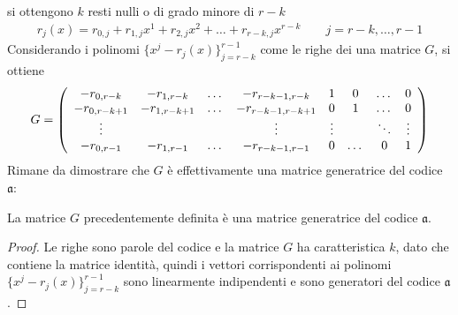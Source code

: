 si ottengono $k$ resti nulli o di grado minore di $r-k$
\begin{align*}
   r_{j}(x) = r_{0,j} + r_{1,j}x^{1} + r_{2,j}x^{2} + \dots + r_{r-k,j}x^{r- k}     \qquad j = r-k , \dots , r-1
\end{align*}
Considerando i polinomi $\lbrace x^j - r_{j}(x)\rbrace_{j= r-k}^{r-1}$ come le righe dei una matrice $G$, si ottiene
\begin{align*}
  G =
  \left(
  \begin{array} {c c c c c c c c}
  -r_{0,r-k}  & -r_{1,r-k}  & \dots & -r_{r-k-1,r-k}  &          1 & 0 & \dots & 0 \\
  -r_{0,r-k+1}  & -r_{1,r-k+1}  & \dots & -r_{r-k-1,r-k+1}  &    0 & 1 & \dots & 0  \\
   \vdots  &  &  & \vdots &                                      \vdots  & & \ddots  & \vdots  \\
  -r_{0,r-1}  & -r_{1,r-1}  & \dots & -r_{r-k-1,r-1}  &           0 & \dots & 0 & 1
  \end{array}
  \right)
\end{align*}
Rimane da dimostrare che $G$ è effettivamente una matrice generatrice del codice $\mathfrak{a}$:
\begin{teorema}
   La matrice $G$ precedentemente definita è una matrice generatrice del codice $\mathfrak{a}$.
\end{teorema}
\begin{proof}
   Le righe sono parole del codice e la matrice $G$ ha caratteristica $k$, dato che contiene la matrice identità, quindi i vettori corrispondenti ai polinomi $\lbrace x^j - r_{j}(x)\rbrace_{j= r-k}^{r-1}$ sono linearmente indipendenti e sono generatori del codice $\mathfrak{a}$.
\end{proof}



